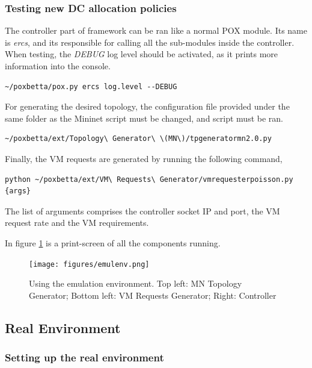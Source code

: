 \documentclass[12pt,english,oneside]{book}
\begin{document}
\subsubsection{Testing new DC allocation policies}

The controller part of framework can be ran like a normal POX module. Its name is \textit{ercs}, and its responsible for calling all the sub-modules inside the controller. When testing, the \textit{DEBUG} log level should be activated, as it prints more information into the console.
\begin{verbatim}
~/poxbetta/pox.py ercs log.level --DEBUG
\end{verbatim}

For generating the desired topology, the configuration file provided under the same folder as the Mininet script must be changed, and script must be ran.
\begin{verbatim}
~/poxbetta/ext/Topology\ Generator\ \(MN\)/tpgeneratormn2.0.py 
\end{verbatim}

Finally, the VM requests are generated by running the following command,
\begin{verbatim}
python ~/poxbetta/ext/VM\ Requests\ Generator/vmrequesterpoisson.py {args}
\end{verbatim}

The list of arguments comprises the controller socket IP and port, the VM request rate and the VM requirements.

\newpage

In figure \ref{fig:emulenv} is a print-screen of all the components running.

\begin{figure}[h!tbp]
        \centering
        \texttt{[image: figures/emulenv.png]}
        \caption{Using the emulation environment. Top left: MN Topology Generator; Bottom left: VM Requests Generator; Right: Controller}
        \label{fig:emulenv}
\end{figure}

\newpage

\subsection{Real Environment}

\subsubsection{Setting up the real environment}
\hspace{0.6cm}
\end{document}
